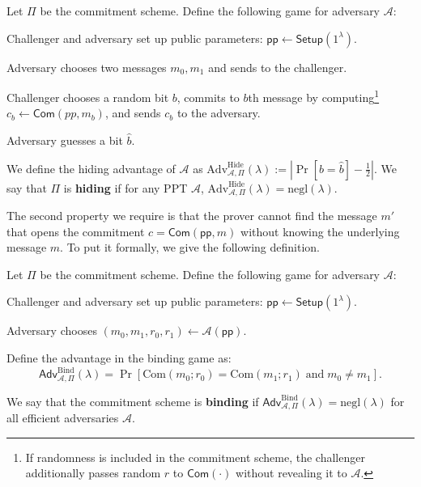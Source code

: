 \documentclass[../../book]{subfiles}
\begin{document}
\begin{definition}\label{def:hiding}
    Let $\Pi$ be the commitment scheme. Define the following game for adversary $\mathcal{A}$:
    \begin{algoen}
        \item Challenger and adversary set up public parameters: $\mathsf{pp} \gets \mathsf{Setup}(1^{\lambda})$.
        \item Adversary chooses two messages $m_0,m_1$ and sends to the challenger.
        \item Challenger chooses a random bit $b$, commits to $b$th message by computing\footnote{If randomness is included in the commitment scheme, the challenger additionally passes random $r$ to $\mathsf{Com}(\cdot)$ without revealing it to $\mathcal{A}$.} $c_b \gets \mathsf{Com}(pp, m_b)$, and sends $c_b$ to the adversary.
        \item Adversary guesses a bit $\hat{b}$.
    \end{algoen}

    We define the hiding advantage of $\mathcal{A}$ as $\text{Adv}^{\text{Hide}}_{\mathcal{A},\Pi}(\lambda) := \left| \Pr[b=\hat{b}] - \frac{1}{2} \right|$.
    We say that $\Pi$ is \textbf{hiding} if for any PPT $\mathcal{A}$, $\text{Adv}^{\text{Hide}}_{\mathcal{A},\Pi}(\lambda) = \text{negl}(\lambda)$.
\end{definition}

The second property we require is that the prover cannot find the message $m'$ that opens the commitment $c=\mathsf{Com}(\mathsf{pp}, m)$ without knowing the underlying message $m$.
To put it formally, we give the following definition.

\begin{definition}
    Let $\Pi$ be the commitment scheme. Define the following game for adversary $\mathcal{A}$:
    \begin{algoen}
        \item Challenger and adversary set up public parameters: $\mathsf{pp} \gets \mathsf{Setup}(1^{\lambda})$.
        \item Adversary chooses $(m_0,m_1,r_0,r_1) \gets \mathcal{A}(\mathsf{pp})$.
    \end{algoen}
        
    Define the advantage in the binding game as:
    \begin{equation*}
        \mathsf{Adv}^{\text{Bind}}_{\mathcal{A}, \Pi}(\lambda) = \Pr[\text{Com}(m_0;r_0) = \text{Com}(m_1;r_1) \; \text{and} \; m_0 \neq m_1].
    \end{equation*}

    We say that the commitment scheme is \textbf{binding} if $\mathsf{Adv}^{\text{Bind}}_{\mathcal{A}, \Pi}(\lambda)=\text{negl}(\lambda)$ for all efficient adversaries $\mathcal{A}$.
\end{definition}
\end{document}
